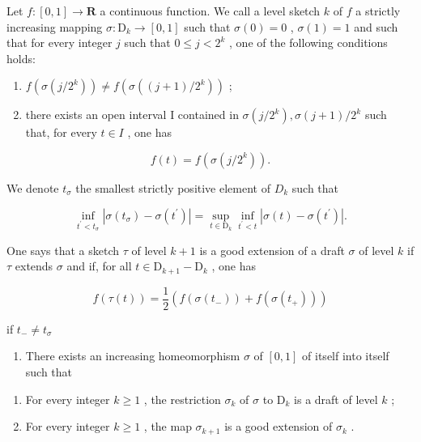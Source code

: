 Let \(f\colon [0,1]\to \mathbf{R}\) a continuous function. We call a level sketch \(k\) of \(f\) a strictly increasing mapping \(\sigma \colon \mathrm{D}_k\to [0,1]\) such that \(\sigma (0) = 0\) , \(\sigma (1) = 1\) and such that for every integer \(j\) such that \(0\leqslant j < 2^k\) , one of the following conditions holds:

\begin{enumerate}
\def\labelenumi{(\roman{enumi})}
\item
  \(f(\sigma(j/2^{k})) \neq f(\sigma((j+1)/2^{k}))\) ;
\item
  there exists an open interval I contained in \(\sigma(j/2^{k}), \sigma(j+1)/2^{k}\) such that, for every \(t \in I\) , one has
\end{enumerate}

\[
f (t) = f (\sigma (j / 2 ^ {k})).
\]

We denote \(t_{\sigma}\) the smallest strictly positive element of \(D_{k}\) such that

\[
\inf _ {t ^ {\prime} <   t _ {\sigma}} | \sigma (t _ {\sigma}) - \sigma (t ^ {\prime}) | = \sup _ {t \in \mathrm{D} _ {k}} \inf _ {t ^ {\prime} <   t} | \sigma (t) - \sigma (t ^ {\prime}) |.
\]

One says that a sketch \(\tau\) of level \(k + 1\) is a good extension of a draft \(\sigma\) of level \(k\) if \(\tau\) extends \(\sigma\) and if, for all \(t \in \mathrm{D}_{k+1} - \mathrm{D}_k\) , one has

\[
f (\tau (t)) = \frac {1}{2} (f (\sigma (t _ {-})) + f (\sigma (t _ {+})))
\]

if \(t_{-}\neq t_{\sigma}\)

\begin{enumerate}
\def\labelenumi{\alph{enumi})}
\setcounter{enumi}{1}
\tightlist
\item
  There exists an increasing homeomorphism \(\sigma\) of \([0,1]\) of itself into itself such that
\end{enumerate}

\begin{enumerate}
\def\labelenumi{(\roman{enumi})}
\item
  For every integer \(k \geqslant 1\) , the restriction \(\sigma_{k}\) of \(\sigma\) to \(\mathrm{D}_{k}\) is a draft of level \(k\) ;
\item
  For every integer \(k \geqslant 1\) , the map \(\sigma_{k+1}\) is a good extension of \(\sigma_{k}\) .
\end{enumerate}

